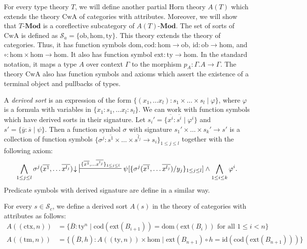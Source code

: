 \documentclass[reqno]{amsart}
\theoremstyle{definition}
\theoremstyle{remark}
\newcommand{\fs}[1]{\mathrm{#1}}
\newcommand{\Mod}[1]{#1\text{-}\mathbf{Mod}}
\numberwithin{figure}{section}
\begin{document}
For every type theory $T$, we will define another partial Horn theory $A(T)$ which extends the theory $\fs{CwA}$ of categories with attributes.
Moreover, we will show that $\Mod{T}$ is a coreflective subcategory of $\Mod{A(T)}$.
The set of sorts of $\fs{CwA}$ is defined as $\mathcal{S}_a = \{ \fs{ob}, \fs{hom}, \fs{ty} \}$.
This theory extends the theory of categories.
Thus, it has function symbols $\fs{dom},\fs{cod} : \fs{hom} \to \fs{ob}$, $\fs{id} : \fs{ob} \to \fs{hom}$, and $\circ : \fs{hom} \times \fs{hom} \to \fs{hom}$.
It also has function symbol $\fs{ext} : \fs{ty} \to \fs{hom}$.
In the standard notation, it maps a type $A$ over context $\Gamma$ to the morphism $p_A : \Gamma.A \to \Gamma$.
The theory $\fs{CwA}$ also has function symbols and axioms which assert the existence of a terminal object and pullbacks of types.

A \emph{derived sort} is an expression of the form $\{ (x_1, \ldots x_l) : s_1 \times \ldots \times s_l \mid \varphi \}$,
where $\varphi$ is a formula with variables in $\{ x_1 : s_1, \ldots x_l : s_l \}$.
We can work with function symbols which have derived sorts in their signature.
Let $s_i' = \{ \overline{x^i} : \overline{s^i} \mid \varphi^i \}$ and $s' = \{ \overline{y} : \overline{s} \mid \psi \}$.
Then a function symbol $\sigma$ with signature $s_1' \times \ldots \times s_k' \to s'$ is a collection of function symbols
$\{ \sigma^j : \overline{s^1} \times \ldots \times \overline{s^{l_j}} \to s_i \}_{1 \leq j \leq l}$ together with the following axiom:
\[ \bigwedge_{1 \leq j \leq l} \sigma^j(\overline{x^1}, \ldots \overline{x^{l_j}})\!\downarrow\ \sststile{}{\{ \overline{x^1}, \ldots \overline{x^{l_j}} \}_{1 \leq j \leq l}} \psi[\{ \sigma^j(\overline{x^1}, \ldots \overline{x^{l_j}})/y_j \}_{1 \leq j \leq l}] \land \bigwedge_{1 \leq i \leq k} \varphi^i. \]
Predicate symbols with derived signature are define in a similar way.

For every $s \in \mathcal{S}_c$, we define a derived sort $A(s)$ in the theory of categories with attributes as follows:
\begin{align*}
A((\fs{ctx},n)) & = \{ \overline{B} : \fs{ty}^n \mid \fs{cod}(\fs{ext}(B_{i+1})) = \fs{dom}(\fs{ext}(B_i)) \text{ for all } 1 \leq i < n \} \\
A((\fs{tm},n)) & = \{ (\overline{B}, h) : A((\fs{ty},n)) \times \fs{hom} \mid \fs{ext}(B_{n+1}) \circ h = \fs{id}(\fs{cod}(\fs{ext}(B_{n+1}))) \}
\end{align*}
\end{document}
